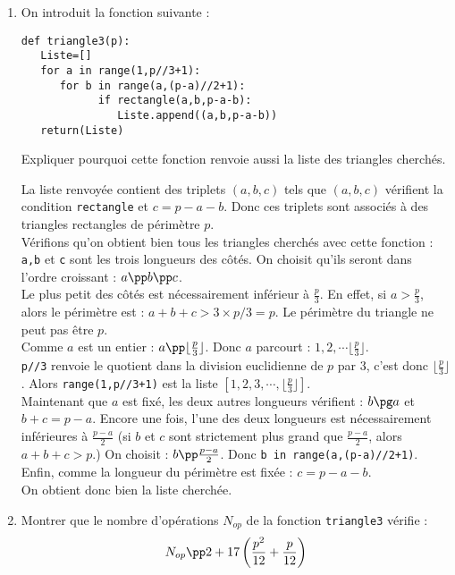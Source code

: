 \documentclass[a4paper,12pt]{article}
\begin{document}
\begin{enumerate}
\begin{enumerate}
\item On introduit la fonction suivante :
\begin{verbatim}
def triangle3(p):
   Liste=[]
   for a in range(1,p//3+1):
      for b in range(a,(p-a)//2+1):
            if rectangle(a,b,p-a-b):
               Liste.append((a,b,p-a-b))
   return(Liste)                  
\end{verbatim}
\noi Expliquer pourquoi cette fonction renvoie aussi la liste des triangles cherch\' es.
\begin{solution}
La liste renvoy\' ee contient des triplets $(a,b,c)$ tels que $(a,b,c)$ v\' erifient la condition \verb?rectangle? et $c=p-a-b$. Donc ces triplets sont associ\' es \` a des triangles rectangles de p\' erim\` etre $p$. \\
V\' erifions qu'on obtient bien tous les triangles cherch\' es avec cette fonction :\\
\verb?a,b? et \verb?c? sont les trois longueurs des c\^ ot\' es. On choisit qu'ils seront dans l'ordre croissant : $a\pp b\pp c$.\\
Le plus petit des c\^ ot\' es est n\' ecessairement inf\' erieur \` a $\frac{p}{3}$. En effet, si $a>\frac{p}{3}$, alors le p\' erim\` etre est : $a+b+c>3\times p/3=p$. Le p\' erim\` etre du triangle ne peut pas \^ etre $p$. \\
Comme $a$ est un entier : $a\pp  \lfloor \frac{p}{3}\rfloor$. Donc $a$ parcourt : $1,2,\cdots \lfloor \frac{p}{3}\rfloor$.\\
\verb?p//3? renvoie le quotient dans la division euclidienne de $p$ par 3, c'est donc $\lfloor \frac{p}{3}\rfloor$. Alors \verb?range(1,p//3+1)? est la liste $[1,2,3,\cdots, \lfloor \frac{p}{3}\rfloor]$.\\
Maintenant que $a$ est fix\' e, les deux autres longueurs v\' erifient : $b\pg a$ et $b+c=p-a$. Encore une fois, l'une des deux longueurs est n\' ecessairement inf\' erieures \` a $\frac{p-a}{2}$ (si $b$ et $c$ sont strictement plus grand que $\frac{p-a}{2}$, alors $a+b+c>p$.) On choisit : $b\pp \frac{p-a}{2}$. Donc \verb?b in range(a,(p-a)//2+1)?.\\
Enfin, comme la longueur du p\' erim\` etre est fix\' ee : $c=p-a-b$. \\
On obtient donc bien la liste cherch\' ee.
\end{solution}
\item Montrer que le nombre d'op\' erations $N_{op}$ de la fonction \verb?triangle3? v\' erifie :
\[N_{op}\pp 2+17\left( \dfrac{p^2}{12}+\dfrac{p}{12} \right)\]

\end{enumerate}
\end{enumerate}
\end{document}
